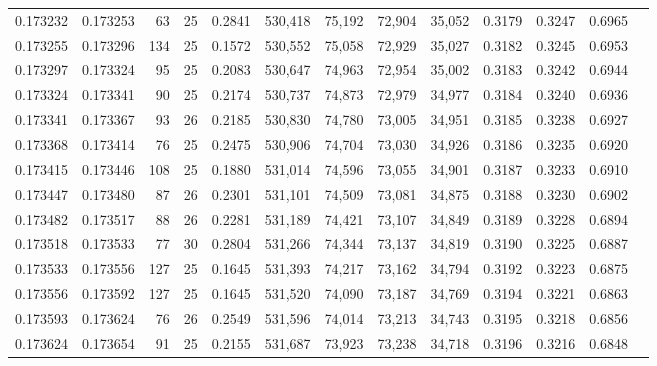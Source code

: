 \begin{tabular}{rrrrrrrrrrrrr}
0.173232 & 0.173253 &  63 &  25 &                                     0.2841 & 530,418 &  75,192 &  72,904 &  35,052 & 0.3179 & 0.3247 & 0.6965 \\
0.173255 & 0.173296 & 134 &  25 &                                     0.1572 & 530,552 &  75,058 &  72,929 &  35,027 & 0.3182 & 0.3245 & 0.6953 \\
0.173297 & 0.173324 &  95 &  25 &                                     0.2083 & 530,647 &  74,963 &  72,954 &  35,002 & 0.3183 & 0.3242 & 0.6944 \\
0.173324 & 0.173341 &  90 &  25 &                                     0.2174 & 530,737 &  74,873 &  72,979 &  34,977 & 0.3184 & 0.3240 & 0.6936 \\
0.173341 & 0.173367 &  93 &  26 &                                     0.2185 & 530,830 &  74,780 &  73,005 &  34,951 & 0.3185 & 0.3238 & 0.6927 \\
0.173368 & 0.173414 &  76 &  25 &                                     0.2475 & 530,906 &  74,704 &  73,030 &  34,926 & 0.3186 & 0.3235 & 0.6920 \\
0.173415 & 0.173446 & 108 &  25 &                                     0.1880 & 531,014 &  74,596 &  73,055 &  34,901 & 0.3187 & 0.3233 & 0.6910 \\
0.173447 & 0.173480 &  87 &  26 &                                     0.2301 & 531,101 &  74,509 &  73,081 &  34,875 & 0.3188 & 0.3230 & 0.6902 \\
0.173482 & 0.173517 &  88 &  26 &                                     0.2281 & 531,189 &  74,421 &  73,107 &  34,849 & 0.3189 & 0.3228 & 0.6894 \\
0.173518 & 0.173533 &  77 &  30 &                                     0.2804 & 531,266 &  74,344 &  73,137 &  34,819 & 0.3190 & 0.3225 & 0.6887 \\
0.173533 & 0.173556 & 127 &  25 &                                     0.1645 & 531,393 &  74,217 &  73,162 &  34,794 & 0.3192 & 0.3223 & 0.6875 \\
0.173556 & 0.173592 & 127 &  25 &                                     0.1645 & 531,520 &  74,090 &  73,187 &  34,769 & 0.3194 & 0.3221 & 0.6863 \\
0.173593 & 0.173624 &  76 &  26 &                                     0.2549 & 531,596 &  74,014 &  73,213 &  34,743 & 0.3195 & 0.3218 & 0.6856 \\
0.173624 & 0.173654 &  91 &  25 &                                     0.2155 & 531,687 &  73,923 &  73,238 &  34,718 & 0.3196 & 0.3216 & 0.6848 \\

\end{tabular}
